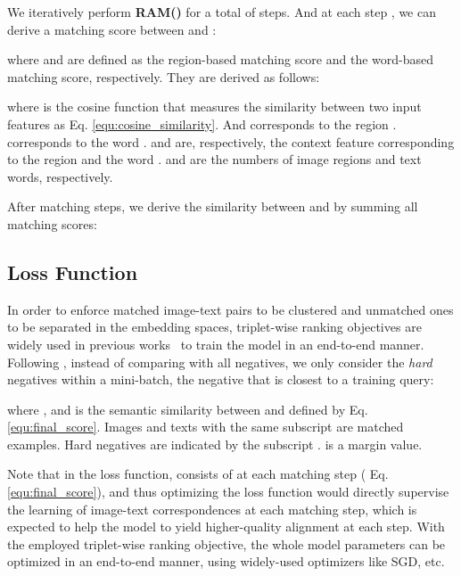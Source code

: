 \documentclass[10pt,twocolumn,letterpaper]{article}
\begin{document}
We iteratively perform \textbf{RAM()} for a total of  steps. And at each step , we can derive a matching score between  and :

where  and  are defined as the region-based matching score and the word-based matching score, respectively. They are derived as follows:


where  is the cosine function that measures the similarity between two input features as Eq. \ref{equ:cosine_similarity}. And  corresponds to the region .  corresponds to the word .  and  are, respectively, the context feature corresponding to the region  and the word .  and  are the numbers of image regions and text words, respectively.

After  matching steps, we derive the similarity between  and  by summing all matching scores:



\subsection{Loss Function}
\label{sec:optimization}
In order to enforce matched image-text pairs to be clustered and unmatched ones to be separated in the embedding spaces, triplet-wise ranking objectives are widely used in previous works~\cite{kiros2014unifying,faghri2017vse++} to train the model in an end-to-end manner. 
Following \cite{faghri2017vse++}, instead of comparing with all negatives, we only consider the \textit{hard} negatives within a mini-batch, \ie{} the negative that is closest to a training query:

where , and  is the semantic similarity between  and  defined by Eq. \ref{equ:final_score}. Images and texts with the same subscript  are matched examples. Hard negatives are indicated by the subscript .  is a margin value.

Note that in the loss function,  consists of  at each matching step (\ie{} Eq. \ref{equ:final_score}), and thus optimizing the loss function would directly supervise the learning of image-text correspondences at each matching step, which is expected to help the model to yield higher-quality alignment at each step. With the employed triplet-wise ranking objective, the whole model parameters can be optimized in an end-to-end manner, using widely-used optimizers like SGD, etc.
\end{document}
